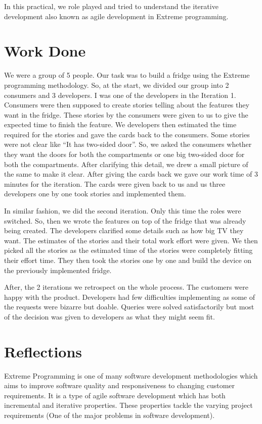 In this practical, we role played and tried to understand the iterative development also known as agile development in Extreme programming.

\section{Work Done}

We were a group of 5 people. Our task was to build a fridge using the Extreme programming methodology. So, at the start, we divided our group into 2 consumers and 3 developers. I was one of the developers in the Iteration 1. Consumers were then supposed to create stories telling about the features they want in the fridge. These stories by the consumers were given to us to give the expected time to finish the feature. We developers then estimated the time required for the stories and gave the cards back to the consumers. Some stories were not clear like ``It has two-sided door''. So, we asked the consumers whether they want the doors for both the compartments or one big two-sided door for both the compartments. After clarifying this detail, we drew a small picture of the same to make it clear. After giving the cards back we gave our work time of 3 minutes for the iteration. The cards were given back to us and us three developers one by one took stories and implemented them.

In similar fashion, we did the second iteration. Only this time the roles were switched. So, then we wrote the features on top of the fridge that was already being created. The developers clarified some details such as how big TV they want. The estimates of the stories and their total work effort were given. We then picked all the stories as the estimated time of the stories were completely fitting their effort time. They then took the stories one by one and build the device on the previously implemented fridge.

After, the 2 iterations we retrospect on the whole process. The customers were happy with the product. Developers had few difficulties implementing as some of the requests were bizarre but doable. Queries were solved satisfactorily but most of the decision was given to developers as what they might seem fit.

\section{Reflections}

Extreme Programming is one of many software development methodologies which aims to improve software quality and responsiveness to changing customer requirements. It is a type of agile software development which has both incremental and iterative properties. These properties tackle the varying project requirements (One of the major problems in software development).

